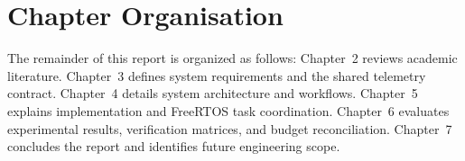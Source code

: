 \section{Chapter Organisation}
The remainder of this report is organized as follows: Chapter~2 reviews academic literature. Chapter~3 defines system requirements and the shared telemetry contract. Chapter~4 details system architecture and workflows. Chapter~5 explains implementation and FreeRTOS task coordination. Chapter~6 evaluates experimental results, verification matrices, and budget reconciliation. Chapter~7 concludes the report and identifies future engineering scope.